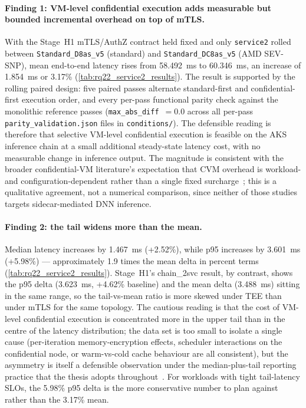 \paragraph{Finding 1: VM-level confidential execution adds measurable but
bounded incremental overhead on top of mTLS.}
With the Stage~H1 mTLS/AuthZ contract held fixed and only \texttt{service2}
rolled between \texttt{Standard\_D8as\_v5} (standard) and
\texttt{Standard\_DC8as\_v5} (AMD SEV-SNP), mean end-to-end latency rises
from 58.492~ms to 60.346~ms, an increase of 1.854~ms or 3.17\%
(\cref{tab:rq22_service2_results}). The result is supported by the rolling
paired design: five paired passes alternate standard-first and
confidential-first execution order, and every per-pass functional parity
check against the monolithic reference passes
(\texttt{max\_abs\_diff}~$=0.0$ across all per-pass
\texttt{parity\_validation.json} files in \texttt{conditions/}). The
defensible reading is therefore that selective VM-level confidential
execution is feasible on the AKS inference chain at a small additional
steady-state latency cost, with no measurable change in inference output.
The magnitude is consistent with the broader confidential-VM literature's
expectation that CVM overhead is workload-
and configuration-dependent rather than a single fixed
surcharge~\cite{misono2024_cvm_explained,akram2021_hpc_tees}; this is a
qualitative agreement, not a numerical comparison, since neither of those
studies targets sidecar-mediated DNN inference.

\paragraph{Finding 2: the tail widens more than the mean.}
Median latency increases by 1.467~ms (+2.52\%), while p95 increases by
3.601~ms (+5.98\%) --- approximately 1.9 times the mean delta in
percent terms (\cref{tab:rq22_service2_results}). Stage~H1's chain\_2svc
result, by contrast, shows the p95 delta (3.623~ms, +4.62\% baseline) and
the mean delta (3.488~ms) sitting in the same range, so the tail-vs-mean
ratio is more skewed under TEE than under mTLS for the same topology.
The cautious reading is that the cost of VM-level confidential execution
is concentrated more in the upper tail than in the centre of the
latency distribution; the data set is too small to isolate a single cause
(per-iteration memory-encryption effects, scheduler interactions on the
confidential node, or warm-vs-cold cache behaviour are all consistent),
but the asymmetry is itself a defensible observation under the
median-plus-tail reporting practice that the thesis adopts
throughout~\cite{benchmarking_sc15}. For workloads with tight tail-latency
SLOs, the 5.98\% p95 delta is the more conservative number to plan
against rather than the 3.17\% mean.

